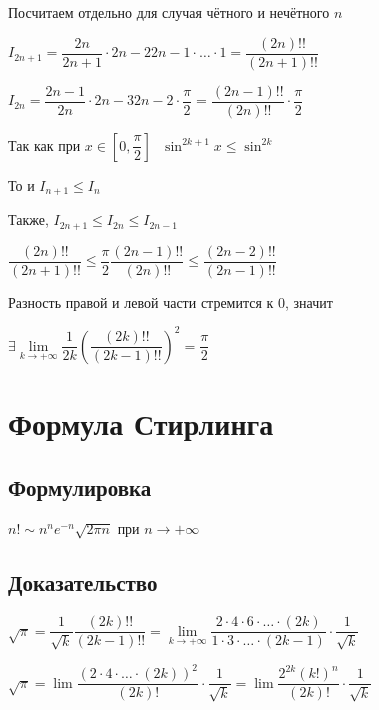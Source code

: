 \documentclass{article}
\begin{document}
            Посчитаем отдельно для случая чётного и нечётного $n$
            
            $I_{2n + 1} = \dfrac{2n}{2n + 1} \cdot {2n - 2}{2n - 1} \cdot \ldots \cdot 1 = \dfrac{(2n)!!}{(2n + 1)!!}$
            
            $I_{2n} = \dfrac{2n - 1}{2n} \cdot {2n - 3}{2n - 2} \cdot \dfrac{\pi}{2} = \dfrac{(2n - 1)!!}{(2n)!!} \cdot \dfrac{\pi}{2}$
            
            Так как при $x \in \left[ 0, \dfrac{\pi}{2} \right] \ \ \ \sin^{2k + 1} x \leq \sin^{2k}$
            
            То и $I_{n + 1} \leq I_n$
            
            Также, $I_{2n + 1} \leq I_{2n} \leq I_{2n - 1}$
            
            $\dfrac{(2n)!!}{(2n + 1)!!} \leq \dfrac{\pi}{2} \dfrac{(2n - 1)!!}{(2n)!!} \leq \dfrac{(2n - 2)!!}{(2n - 1)!!}$
            
            Разность правой и левой части стремится к $0$, значит 
            
            $\exists \lim\limits_{k \rightarrow +\infty} \dfrac{1}{2k} \left( \dfrac{(2k)!!}{(2k - 1)!!} \right)^2 = \dfrac{\pi}{2}$
            
    \newpage
    
    \section{Формула Стирлинга}
    
        \subsection{Формулировка}
        
            $n! \sim n^n e^{-n} \sqrt{2 \pi n}$ при $n \rightarrow +\infty$
            
        \subsection{Доказательство}
        
            $\sqrt{\pi} = \dfrac{1}{\sqrt{k}} \dfrac{(2k)!!}{(2k - 1)!!} = \lim\limits_{k \rightarrow +\infty} \dfrac{2 \cdot 4 \cdot 6 \cdot \ldots \cdot (2k)}{1 \cdot 3 \cdot \ldots \cdot (2k - 1)} \cdot \dfrac{1}{\sqrt{k}}$
            
            $\sqrt{\pi} = \lim \dfrac{(2 \cdot 4 \cdot \ldots \cdot (2k))^2}{(2k)!} \cdot \dfrac{1}{\sqrt{k}} = \lim \dfrac{2^{2k} (k!)^n}{(2k)!} \cdot \dfrac{1}{\sqrt{k}}$
            
\end{document}

